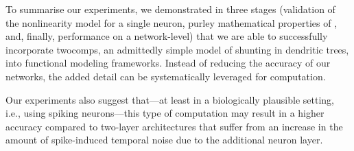To summarise our experiments, we demonstrated in three stages (validation of the nonlinearity model \Hcond for a single neuron, purley mathematical properties of \Hcond, and, finally, performance on a network-level) that we are able to successfully incorporate \glspl{twocomp}, an admittedly simple model of shunting in dendritic trees, into functional modeling frameworks.
Instead of reducing the accuracy of our networks, the added detail can be systematically leveraged for computation.

Our experiments also suggest that---at least in a biologically plausible setting, i.e., using spiking neurons---this type of computation may result in a higher accuracy compared to two-layer architectures that suffer from an increase in the amount of spike-induced temporal noise due to the additional neuron layer.

